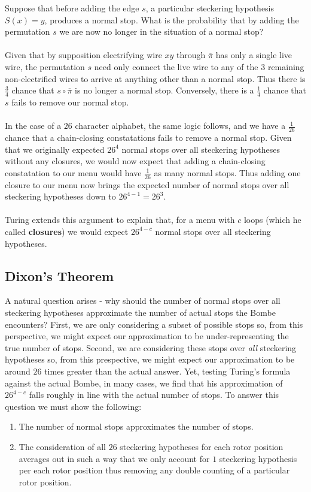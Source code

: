 \noindent Suppose that before adding the edge $s$, a particular
steckering hypothesis $S(x) = y$,
produces a normal stop.
What is the probability that by adding the permutation $s$ we are now
no longer in the situation of a normal stop?
\\\\Given that by supposition electrifying wire $xy$ through
$\overline\pi$ has only a single live wire, the permutation $s$ need
only connect the live wire to any of the $3$ remaining
non-electrified wires to arrive at anything other than a normal stop.
Thus there is $\frac{3}{4}$ chance that $s\circ\overline\pi$ is no
longer a normal stop. Conversely, there is a $\frac{1}{4}$ chance
that $s$ fails to remove our normal stop.
\\\\In the case of a $26$ character alphabet, the same logic follows,
and we have a $\frac{1}{26}$ chance that a chain-closing
constatations fails to remove a normal stop. Given that we originally
expected $26^4$ normal stops over all steckering hypotheses without
any closures, we would now expect that adding a chain-closing
constatation to our menu would have $\frac{1}{26}$ as many normal
stops. Thus adding one closure to our menu now brings the expected
number of normal stops over all steckering hypotheses down to $26^{4-1} = 26^3$.
\\\\Turing extends this argument to explain that, for a menu with $c$
loops (which he called {\bf{closures}}) we would expect $26^{4-c}$
normal stops over all steckering hypotheses.
\subsection{Dixon's Theorem}
A natural question arises - why should the number of normal stops
over all steckering hypotheses approximate the number of actual stops
the Bombe encounters?
First, we are only considering a subset of possible stops so, from
this perspective, we might
expect our approximation to be under-representing the true number of
stops. Second, we are considering these
stops over \emph{all} steckering hypotheses so, from this
prespective, we might expect our
approximation to be around $26$ times greater than the actual answer.
Yet, testing Turing's formula against the actual Bombe, in many cases,
we find that his approximation of $26^{4-c}$ falls roughly in line
with the actual number of stops. To answer this question we must show
the following:
\begin{enumerate}[(1)]
  \item The number of normal stops approximates the number of stops.
  \item The consideration of all $26$ steckering hypotheses for each
    rotor position averages out in such a way that we only account for $1$
    steckering hypothesis per each rotor position thus removing any
    double counting of a particular rotor position.
\end{enumerate}
